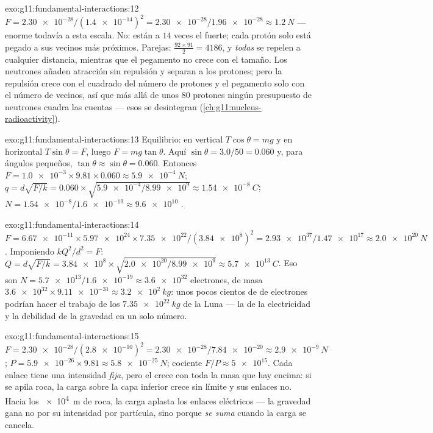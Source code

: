 \begin{solution}{exo:g11:fundamental-interactions:12}
$F = \num{2.30e-28}/(\num{1.4e-14})^2 = \num{2.30e-28}/\num{1.96e-28}
\approx \qty{1.2}{N}$ --- enorme todavía a esta escala. No: están a $14$
veces el  fuerte; cada protón solo está pegado a sus vecinos más
próximos. Parejas: $\frac{92 \times 91}{2} = 4186$, y \emph{todas} se
repelen a cualquier distancia, mientras que el pegamento no crece con el
tamaño. Los neutrones añaden atracción sin repulsión y separan a los
protones; pero la repulsión crece con el cuadrado del número de protones
y el pegamento solo con el número de vecinos, así que más allá de unos
$80$ protones ningún presupuesto de neutrones cuadra las cuentas ---
esos  se desintegran
(\cref{ch:g11:nucleus-radioactivity}).
\end{solution}

\begin{solution}{exo:g11:fundamental-interactions:13}
Equilibrio: en vertical $T\cos\theta = mg$ y en horizontal
$T\sin\theta = F$, luego $F = mg\tan\theta$. Aquí
$\sin\theta = 3.0/50 = 0.060$ y, para ángulos pequeños,
$\tan\theta \approx \sin\theta = 0.060$. Entonces
$F = \num{1.0e-3} \times 9.81 \times 0.060 \approx \qty{5.9e-4}{N}$;
$q = d\sqrt{F/k} = 0.060 \times \sqrt{\num{5.9e-4}/\num{8.99e9}}
\approx \qty{1.54e-8}{C}$;
$N = \num{1.54e-8}/\num{1.6e-19} \approx \num{9.6e10}$ .
\end{solution}

\begin{solution}{exo:g11:fundamental-interactions:14}
$F = \num{6.67e-11} \times \num{5.97e24} \times \num{7.35e22} /
(\num{3.84e8})^2 = \num{2.93e37}/\num{1.47e17} \approx \qty{2.0e20}{N}$.
Imponiendo $kQ^2/d^2 = F$:
$Q = d\sqrt{F/k} = \num{3.84e8} \times \sqrt{\num{2.0e20}/\num{8.99e9}}
\approx \qty{5.7e13}{C}$. Eso son
$N = \num{5.7e13}/\num{1.6e-19} \approx \num{3.6e32}$ electrones, de
masa $\num{3.6e32} \times \num{9.11e-31} \approx \qty{3.2e2}{kg}$: unos
pocos cientos de  de electrones podrían hacer el trabajo de
los $\qty{7.35e22}{kg}$ de la Luna --- la  de la electricidad y la
debilidad de la gravedad en un solo número.
\end{solution}

\begin{solution}{exo:g11:fundamental-interactions:15}
$F = \num{2.30e-28}/(\num{2.8e-10})^2 = \num{2.30e-28}/\num{7.84e-20}
\approx \qty{2.9e-9}{N}$; 
$P = \num{5.9e-26} \times 9.81 \approx \qty{5.8e-25}{N}$; cociente
$F/P \approx \num{5e15}$. Cada enlace tiene una intensidad
\emph{fija}, pero el  crece con toda la masa que hay encima: si se
apila roca, la carga sobre la capa inferior crece sin límite y sus
enlaces no. Hacia los \qty{e4}{m} de roca, la carga aplasta los enlaces
eléctricos --- la gravedad gana no por su intensidad por partícula, sino
porque \emph{se suma} cuando la carga se cancela.
\end{solution}

